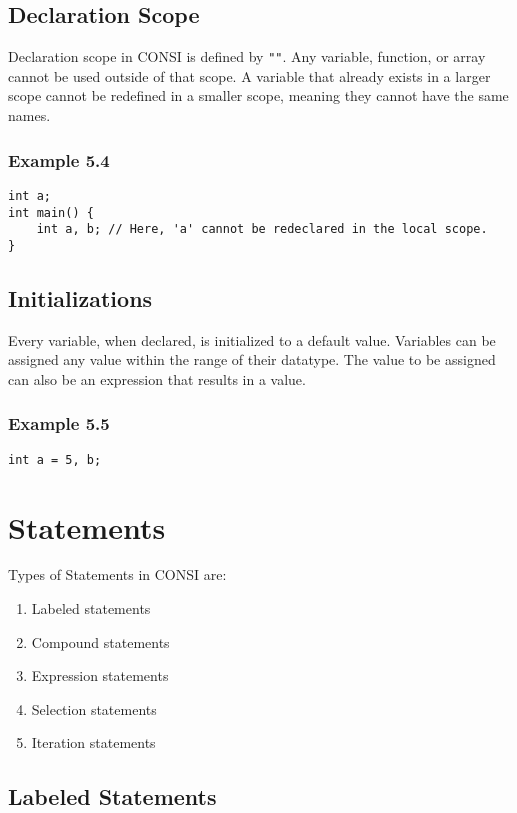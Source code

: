 \documentclass[12pt]{fphw}
\begin{document}
\subsection{Declaration Scope}

Declaration scope in CONSI is defined by \texttt{""}. Any variable, function, or array cannot be used outside of that scope. A variable that already exists in a larger scope cannot be redefined in a smaller scope, meaning they cannot have the same names.

\subsubsection*{Example 5.4}
\begin{verbatim}
int a;
int main() {
    int a, b; // Here, 'a' cannot be redeclared in the local scope.
}
\end{verbatim}

\subsection{Initializations}

Every variable, when declared, is initialized to a default value. Variables can be assigned any value within the range of their datatype. The value to be assigned can also be an expression that results in a value.

\subsubsection*{Example 5.5}
\begin{verbatim}
int a = 5, b;
\end{verbatim}


\section{Statements}

Types of Statements in CONSI are:
\begin{enumerate}
    \item Labeled statements
    \item Compound statements
    \item Expression statements
    \item Selection statements
    \item Iteration statements
\end{enumerate}

\subsection{Labeled Statements}
\end{document}
